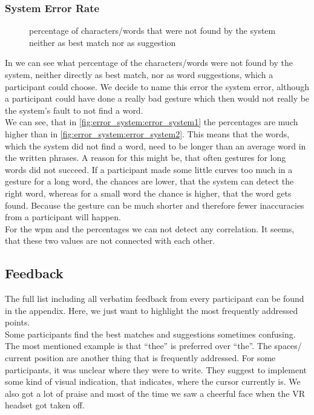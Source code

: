 \subsubsection{System Error Rate}
\begin{figure}[H]
    \caption{percentage of characters/words that were not found by the system neither as best match nor as suggestion}
    \label{fig:error_system}
\end{figure}

In  we can see what percentage of the characters/words were not found by the system, neither directly as best match, nor as word suggestions, which a participant could choose. We decide to name this error the system error, although a participant could have done a really bad gesture which then would not really be the system's fault to not find a word.\\
We can see, that in \cref{fig:error_system:error_system1} the percentages are much higher than in \cref{fig:error_system:error_system2}. This means that the words, which the system did not find a word, need to be longer than an average word in the written phrases. A reason for this might be, that often gestures for long words did not succeed. If a participant made some little curves too much in a gesture for a long word, the chances are lower, that the system can detect the right word, whereas for a small word the chance is higher, that the word gets found. Because the gesture can be much shorter and therefore fewer inaccuracies from a participant will happen.\\
For the wpm and the percentages we can not detect any correlation. It seems, that these two values are not connected with each other. 

\subsection{Feedback}
The full list including all verbatim feedback from every participant can be found in the appendix. Here, we just want to highlight the most frequently addressed points.\\
Some participants find the best matches and suggestions sometimes confusing. The most mentioned example is that ``thee'' is preferred over ``the''. The spaces/ current position are another thing that is frequently addressed. For some participants, it was unclear where they were to write. They suggest to implement some kind of visual indication, that indicates, where the cursor currently is. We also got a lot of praise and most of the time we saw a cheerful face when the VR headset got taken off.

